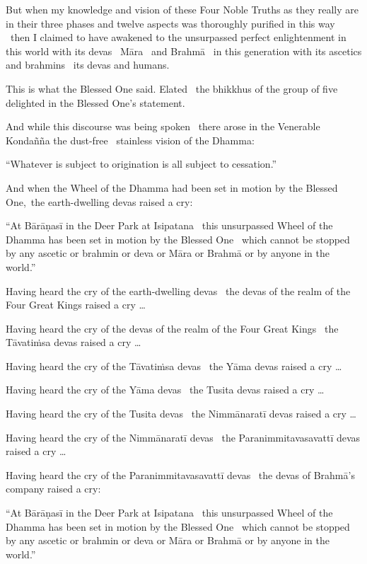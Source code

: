 But when my knowledge and vision of these Four Noble Truths as they really are in their three phases and twelve aspects was thoroughly purified in this way \breathmark\ then I claimed to have awakened to the unsurpassed perfect enlightenment in this world with its devas \breathmark\ Māra \breathmark\ and Brahmā \breathmark\ in this generation with its ascetics and brahmins \breathmark\ its devas and humans.

This is what the Blessed One said. Elated \breathmark\ the bhikkhus of the group of five delighted in the Blessed One’s statement.

And while this discourse was being spoken \breathmark\ there arose in the Venerable Kondañña the dust-free \breathmark\ stainless vision of the Dhamma:

“Whatever is subject to origination is all subject to cessation.”

And when the Wheel of the Dhamma had been set in motion by the Blessed One, the earth-dwelling devas raised a cry:

“At Bārāṇasī in the Deer Park at Isipatana \breathmark\ this unsurpassed Wheel of the Dhamma has been set in motion by the Blessed One \breathmark\ which cannot be stopped by any ascetic or brahmin or deva or Māra or Brahmā or by anyone in the world.”

Having heard the cry of the earth-dwelling devas \breathmark\ the devas of the realm of the Four Great Kings raised a cry …

Having heard the cry of the devas of the realm of the Four Great Kings \breathmark\ the Tāvatiṁsa devas raised a cry …

Having heard the cry of the Tāvatiṁsa devas \breathmark\ the Yāma devas raised a cry …

Having heard the cry of the Yāma devas \breathmark\ the Tusita devas raised a cry …

Having heard the cry of the Tusita devas \breathmark\ the Nimmānaratī devas raised a cry …

Having heard the cry of the Nimmānaratī devas \breathmark\ the Paranimmitavasavattī devas raised a cry …

Having heard the cry of the Paranimmitavasavattī devas \breathmark\ the devas of Brahmā’s company raised a cry:

“At Bārāṇasī in the Deer Park at Isipatana \breathmark\ this unsurpassed Wheel of the Dhamma has been set in motion by the Blessed One \breathmark\ which cannot be stopped by any ascetic or brahmin or deva or Māra or Brahmā or by anyone in the world.”

